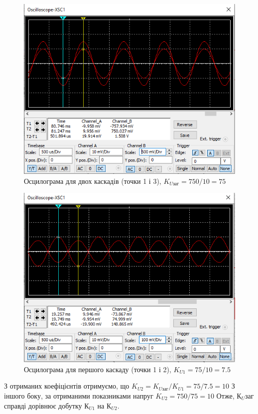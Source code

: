 \documentclass{article}
\begin{document}
\begin{normalsize}
	\begin{figure}[H]
		\centering
		\includegraphics[width=\textwidth]{31}
		\caption{Осцилограма для двох каскадів (точки 1 і 3), $K_{U\text{заг}} = 750/10= 75$}
	\end{figure}
	
	\begin{figure}[H]
		\centering
		\includegraphics[width=\textwidth]{32}
		\caption{Осцилограма для першого каскаду (точки 1 і 2), $K_{U1} = 75/10= 7.5$}
	\end{figure}
	
	З отриманих коефіцієнтів отримуємо, що $K_{U2} = K_{U\text{заг}} / K_{U1} = 75 / 7.5= 10$
	З іншого боку, за отриманими показниками напруг $K_{U2} = 750 / 75 = 10$
	Отже, $К_U\text{заг}$ справді дорівнює добутку $К_{U1}$ на $К_{U2}$.
	

\end{normalsize}
\end{document}
